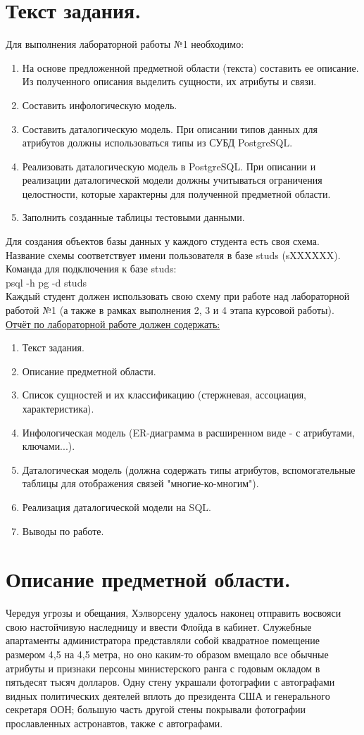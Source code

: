 \documentclass[12pt,onecolumn]{article}
\begin{document}
\section{Текст задания.}
Для выполнения лабораторной работы №1 необходимо:
\begin{enumerate}
  \item На основе предложенной предметной области (текста) составить ее описание. Из полученного описания выделить сущности, их атрибуты и связи.
  \item Составить инфологическую модель.
  \item Составить даталогическую модель. При описании типов данных для атрибутов должны использоваться типы из СУБД PostgreSQL.
  \item Реализовать даталогическую модель в PostgreSQL. При описании и реализации даталогической модели должны учитываться ограничения целостности, которые характерны для полученной предметной области.
  \item Заполнить созданные таблицы тестовыми данными.
\end{enumerate}
Для создания объектов базы данных у каждого студента есть своя схема. Название схемы соответствует имени пользователя в базе studs (sXXXXXX). Команда для подключения к базе studs:\\
psql -h pg -d studs \\
Каждый студент должен использовать свою схему при работе над лабораторной работой №1 (а также в рамках выполнения 2, 3 и 4 этапа курсовой работы).\\
\underline{Отчёт по лабораторной работе должен содержать:}
\begin{enumerate}
  \item Текст задания.
  \item Описание предметной области.
  \item Список сущностей и их классификацию (стержневая, ассоциация, характеристика).
  \item Инфологическая модель (ER-диаграмма в расширенном виде - с атрибутами, ключами...).
  \item Даталогическая модель (должна содержать типы атрибутов, вспомогательные таблицы для отображения связей "многие-ко-многим").
  \item Реализация даталогической модели на SQL.
  \item Выводы по работе.
\end{enumerate}
\section{Описание предметной области.}
Чередуя угрозы и обещания, Хэлворсену удалось наконец отправить восвояси свою настойчивую наследницу и ввести Флойда в кабинет. Служебные апартаменты администратора представляли собой квадратное помещение размером 4,5 на 4,5 метра, но оно каким-то образом вмещало все обычные атрибуты и признаки персоны министерского ранга с годовым окладом в пятьдесят тысяч долларов. Одну стену украшали фотографии с автографами видных политических деятелей вплоть до президента США и генерального секретаря ООН; большую часть другой стены покрывали фотографии прославленных астронавтов, также с автографами. 
\end{document}
